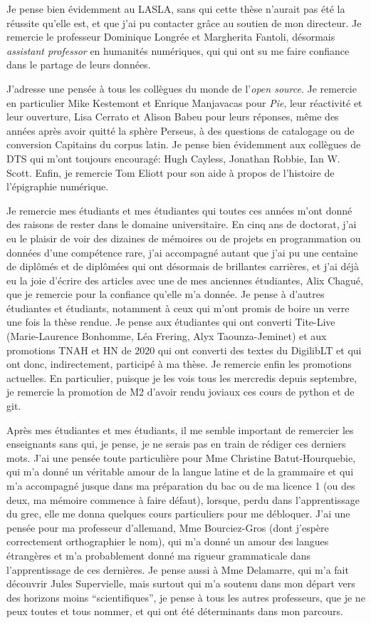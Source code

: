 Je pense bien évidemment au LASLA, sans qui cette thèse n'aurait pas été la réussite qu'elle est, et que j'ai pu contacter grâce au soutien de mon directeur. Je remercie le professeur Dominique Longrée et 
Margherita Fantoli, désormais \textit{assistant professor} en humanités numériques, qui qui ont su me faire confiance dans le partage de leurs données.

J'adresse une pensée à tous les collègues du monde de l'\textit{open source}. Je remercie en particulier Mike Kestemont et Enrique Manjavacas pour \textit{Pie}, leur réactivité et leur ouverture, Lisa Cerrato et Alison Babeu pour leurs réponses, même des années après avoir quitté la sphère Perseus, à des questions de catalogage ou de conversion Capitains du corpus latin. Je pense bien évidemment aux collègues de DTS qui m'ont toujours encouragé: Hugh Cayless, Jonathan Robbie, Ian W. Scott. Enfin, je remercie Tom Eliott pour son aide à propos de l'histoire de l'épigraphie numérique. 

Je remercie mes étudiants et mes étudiantes qui toutes ces années m'ont donné des raisons de rester dans le domaine universitaire. En cinq ans de doctorat, j'ai eu le plaisir de voir des dizaines de mémoires ou de projets en programmation ou données d'une compétence rare, j'ai accompagné autant que j'ai pu une centaine de diplômés et de diplômées qui ont désormais de brillantes carrières, et j'ai déjà eu la joie d'écrire des articles avec une de mes anciennes étudiantes, Alix Chagué, que je remercie pour la confiance qu'elle m'a donnée. Je pense à d'autres étudiantes et étudiants, notamment à ceux qui m'ont promis de boire un verre une fois la thèse rendue. Je pense aux étudiantes qui ont converti Tite-Live (Marie-Laurence Bonhomme, Léa Frering, Alyx Taounza-Jeminet) et aux promotions TNAH et HN de 2020 qui ont converti des textes du DigilibLT et qui ont donc, indirectement, participé à ma thèse. Je remercie enfin les promotions actuelles. En particulier, puisque je les vois tous les mercredis depuis septembre, je remercie la promotion de M2 d'avoir rendu joviaux ces cours de python et de git.

Après mes étudiantes et mes étudiants, il me semble important de remercier les enseignants sans qui, je pense, je ne serais pas en train de rédiger ces derniers mots. J'ai une pensée toute particulière pour Mme Christine Batut-Hourquebie, qui m'a donné un véritable amour de la langue latine et de la grammaire et qui m'a accompagné jusque dans ma préparation du bac ou de ma licence 1 (ou des deux, ma mémoire commence à faire défaut), lorsque, perdu dans l'apprentissage du grec, elle me donna quelques cours particuliers pour me débloquer. J'ai une pensée pour ma professeur d'allemand, Mme Bourciez-Gros (dont j'espère correctement orthographier le nom), qui m'a donné un amour des langues étrangères et m'a probablement donné ma rigueur grammaticale dans l'apprentissage de ces dernières. Je pense aussi à Mme Delamarre, qui m'a fait découvrir Jules Supervielle, mais surtout qui m'a soutenu dans mon départ vers des horizons moins \enquote{scientifiques}, je pense à tous les autres professeurs, que je ne peux toutes et tous nommer, et qui ont été déterminants dans mon parcours.

